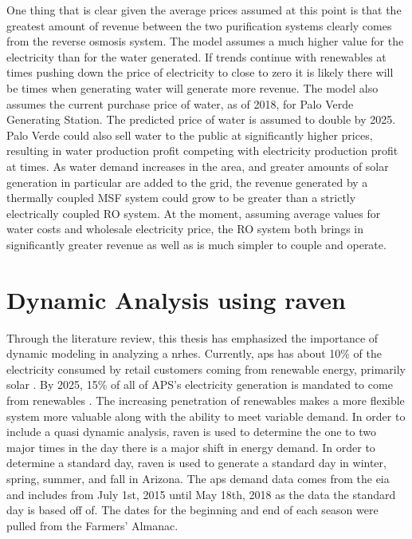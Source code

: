 \documentclass[12pt]{UIdahoMastersThesis}
\begin{document}
	One thing that is clear given the average prices assumed at this point is that the greatest amount of revenue between the two purification systems clearly comes from the reverse osmosis system.  The model assumes a much higher value for the electricity than for the water generated.  If trends continue with renewables at times pushing down the price of electricity to close to zero it is likely there will be times when generating water will generate more revenue.  The model also assumes the current purchase price of water, as of 2018, for Palo Verde Generating Station. The predicted price of water is assumed to double by 2025\cite{Brown2018}.  Palo Verde could also sell water to the public at significantly higher prices, resulting in water production profit competing with electricity production profit at times. As water demand increases in the area, and greater amounts of solar generation in particular are added to the grid, the revenue generated by a thermally coupled MSF system could grow to be greater than a strictly electrically coupled RO system. At the moment, assuming average values for water costs and wholesale electricity price, the RO system both brings in significantly greater revenue as well as is much simpler to couple and operate.  


\section{Dynamic Analysis using \ac{raven}}

Through the literature review, this thesis has emphasized the importance of dynamic modeling in analyzing a \ac{nrhes}. Currently, \ac{aps} has about 10\% of the electricity consumed by retail customers coming from renewable energy, primarily solar \cite{ArizonaPublicService2018}.  By 2025, 15\% of all of APS's electricity generation is mandated to come from renewables \cite{UtilitiesDivision}. The increasing penetration of renewables makes a more flexible system more valuable along with the ability to meet variable demand. In order to include a quasi dynamic analysis, \ac{raven} is used to determine the one to two major times in the day there is a major shift in energy demand. In order to determine a standard day, \ac{raven} is used to generate a standard day in winter, spring, summer, and fall in Arizona. The \ac{aps} demand data comes from the \ac{eia} and includes from July 1st, 2015 until May 18th, 2018 as the data the standard day is based off of.  The dates for the beginning and end of each season were pulled from the Farmers' Almanac\cite{Almanac}.
\end{document}

